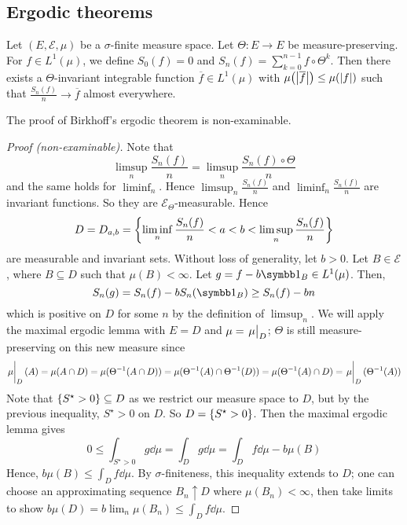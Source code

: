 \subsection{Ergodic theorems}
\begin{theorem}[Birkhoff]
	Let \( (E, \mathcal E, \mu) \) be a \( \sigma \)-finite measure space.
	Let \( \Theta \colon E \to E \) be measure-preserving.
	For \( f \in L^1(\mu) \), we define \( S_0(f) = 0 \) and \( S_n(f) = \sum_{k=0}^{n-1} f \circ \Theta^k \).
	Then there exists a \( \Theta \)-invariant integrable function \( \overline f \in L^1(\mu) \) with \( \mu\qty(\abs{\overline f}) \leq \mu(\abs{f}) \) such that \( \frac{S_n(f)}{n} \to \overline f \) almost everywhere.
\end{theorem}
The proof of Birkhoff's ergodic theorem is non-examinable.
\begin{proof}[Proof (non-examinable)]
    Note that
    \[ \limsup_n \frac{S_n(f)}{n} =  \limsup_n \frac{S_n(f) \circ \Theta}{n} \]
    and the same holds for \( \liminf_n \).
    Hence \( \limsup_n \frac{S_n(f)}{n} \) and \( \liminf_n \frac{S_n(f)}{n} \) are invariant functions.
    So they are \( \mathcal E_\Theta \)-measurable.
    Hence
    \[ D = D_{a,b} = \qty{\liminf_n \frac{S_n(f)}{n} < a < b < \limsup_n \frac{S_n(f)}{n}} \]
    are measurable and invariant sets.
    Without loss of generality, let \( b > 0 \).
    Let \( B \in \mathcal E \), where \( B \subseteq D \) such that \( \mu(B) < \infty \).
    Let \( g = f - b\symbb 1_B \in L^1(\mu) \).
    Then,
    \[ S_n(g) = S_n(f) - bS_n(\symbb 1_B) \geq S_n(f) - bn \]
    which is positive on \( D \) for some \( n \) by the definition of \( \limsup_n \).
    We will apply the maximal ergodic lemma with \( E = D \) and \( \mu = \eval{\mu}_D \); \( \Theta \) is still measure-preserving on this new measure since
    \[ \eval{\mu}_D(A) = \mu(A \cap D) = \mu(\Theta^{-1}(A \cap D)) = \mu(\Theta^{-1}(A) \cap \Theta^{-1}(D)) = \mu(\Theta^{-1}(A) \cap D) = \eval{\mu}_D(\Theta^{-1}(A)) \]
    Note that \( \qty{S^\star > 0} \subseteq D \) as we restrict our measure space to \( D \), but by the previous inequality, \( S^\star > 0 \) on \( D \).
    So \( D = \qty{S^\star > 0} \).
    Then the maximal ergodic lemma gives
    \[ 0 \leq \int_{S^\star > 0} g \dd{\mu} = \int_D g \dd{\mu} = \int_D f \dd{\mu} - b \mu(B) \]
    Hence, \( b \mu(B) \leq \int_D f \dd{\mu} \).
    By \( \sigma \)-finiteness, this inequality extends to \( D \); one can choose an approximating sequence \( B_n \uparrow D \) where \( \mu(B_n) < \infty \), then take limits to show \( b\mu(D) = b \lim_n \mu(B_n) \leq \int_D f \dd{\mu} \).

\end{proof}
